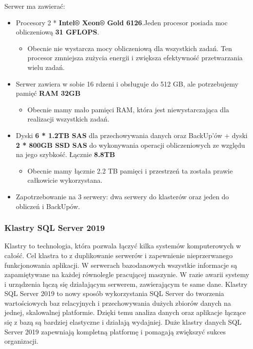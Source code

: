 \documentclass[a4paper, 12pt]{article}
\begin{document}
Serwer ma zawierać: 
				\begin{itemize}
\item Procesory 2 * \textbf{Intel® Xeon® Gold 6126}.Jeden procesor posiada moc obliczeniową \textbf{31 GFLOPS}. 
							\begin{itemize}
\item Obecnie nie wystarcza mocy obliczeniową dla wszystkich zadań. Ten procesor zmniejsza zużycia energii i zwiększa efektywność przetwarzania wielu zadań.
							\end{itemize}
\item  Serwer zawiera w sobie 16 rdzeni i obsługuje do 512 GB, ale potrzebujemy pamięć \textbf{RAM 32GB}
							\begin{itemize}
\item Obecnie mamy mało pamięci RAM, która jest niewystarczająca dla realizacji wszystkich zadań.
							\end{itemize}
\item Dyski \textbf{ 6 * 1.2TB SAS} dla przechowywania danych  oraz BackUp'ów  + dyski \textbf{2 * 800GB SSD SAS} do wykonywania operacji obliczeniowych ze względu na jego szybkość. Łącznie \textbf{8.8TB} 
								\begin{itemize}
\item Obecnie mamy łącznie 2.2 TB pamięci i przestrzeń ta została prawie całkowicie wykorzystana.
								\end{itemize}
\item Zapotrzebowanie na 3 serwery: dwa serwery do klasterów oraz jeden do obliczeń i BackUpów.
				\end{itemize}			
				\subsubsection{Klastry SQL Server 2019} 	
	\hspace*{1cm} Klastry to technologia, która pozwala łączyć kilka systemów komputerowych w całość. 
Cel klastra to z duplikowanie  serwerów i zapewnienie nieprzerwanego funkcjonowania aplikacji. W serwerach bazodanowych wszystkie informacje są zapamiętywane na każdej równolegle pracującej maszynie. W razie awarii systemy i urządzenia łączą się działającym serwerem, zawierającym te same dane.
\newline
	\hspace*{1cm}Klastry SQL Server 2019 to nowy sposób wykorzystania SQL Server do tworzenia wartościowych baz relacyjnych i przechowywania dużych zbiorów danych na jednej, skalowalnej platformie. Dzięki temu analiza danych oraz aplikacje łączące się z bazą są bardziej elastyczne i działają wydajniej. Duże klastry danych SQL Server 2019 zapewniają kompletną platformę i pomagają zwiększyć sukces  organizacji.
\end{document}
